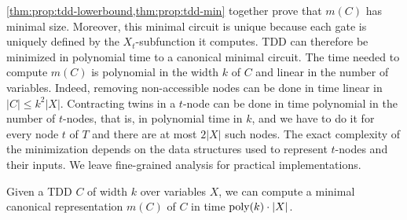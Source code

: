 \documentclass[a4paper,UKenglish,cleveref, autoref, thm-restate]{lipics-v2021}
\begin{document}
\cref{thm:prop:tdd-lowerbound,thm:prop:tdd-min} together prove that $m(C)$ has minimal size. Moreover, this minimal circuit is unique because each gate is uniquely defined by the $X_t$-subfunction it computes. TDD can therefore be minimized in polynomial time to a canonical minimal circuit.  The time needed to compute $m(C)$ is polynomial in the width $k$ of $C$ and linear in the number of variables. Indeed, removing non-accessible nodes can be done in time linear in $|C| \leq k^2|X|$. Contracting twins in a $t$-node can be done in time polynomial in the number of $t$-nodes, that is, in polynomial time in $k$, and we have to do it for every node $t$ of $T$ and there are at most $2|X|$ such nodes. The exact complexity of the minimization depends on the data structures used to represent $t$-nodes and their inputs. We leave fine-grained analysis for practical implementations.
%
\begin{theorem}
  \label{thm:prop:tdd-minization-complexity} Given a TDD $C$ of width $k$ over variables $X$, we can compute a minimal canonical representation $m(C)$ of $C$ in time $\operatorname{poly}(k) \cdot |X|$. 
\end{theorem}



\end{document}

